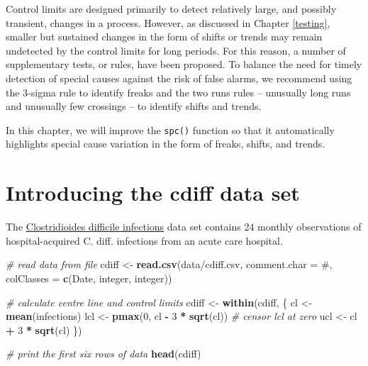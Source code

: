 \documentclass[
]{book}
\newenvironment{Shaded}{\begin{snugshade}}{\end{snugshade}}
\newcommand{\AttributeTok}[1]{\textcolor[rgb]{0.13,0.29,0.53}{#1}}
\newcommand{\CommentTok}[1]{\textcolor[rgb]{0.56,0.35,0.01}{\textit{#1}}}
\newcommand{\DecValTok}[1]{\textcolor[rgb]{0.00,0.00,0.81}{#1}}
\newcommand{\FunctionTok}[1]{\textcolor[rgb]{0.13,0.29,0.53}{\textbf{#1}}}
\newcommand{\NormalTok}[1]{#1}
\newcommand{\OtherTok}[1]{\textcolor[rgb]{0.56,0.35,0.01}{#1}}
\newcommand{\SpecialCharTok}[1]{\textcolor[rgb]{0.81,0.36,0.00}{\textbf{#1}}}
\newcommand{\StringTok}[1]{\textcolor[rgb]{0.31,0.60,0.02}{#1}}
\begin{document}
Control limits are designed primarily to detect relatively large, and possibly transient, changes in a process. However, as discussed in Chapter \ref{testing}, smaller but sustained changes in the form of shifts or trends may remain undetected by the control limits for long periods. For this reason, a number of supplementary tests, or rules, have been proposed. To balance the need for timely detection of special causes against the risk of false alarms, we recommend using the 3-sigma rule to identify freaks and the two runs rules -- unusually long runs and unusually few crossings -- to identify shifts and trends.

In this chapter, we will improve the \texttt{spc()} function so that it automatically highlights special cause variation in the form of freaks, shifts, and trends.

\section{Introducing the cdiff data set}\label{introducing-the-cdiff-data-set}

The \hyperref[clostridioides-difficile-infections]{Clostridioides difficile infections} data set contains 24 monthly observations of hospital-acquired C. diff. infections from an acute care hospital.

\begin{Shaded}
\begin{Highlighting}[]
\CommentTok{\# read data from file}
\NormalTok{cdiff }\OtherTok{\textless{}{-}} \FunctionTok{read.csv}\NormalTok{(}\StringTok{\textquotesingle{}data/cdiff.csv\textquotesingle{}}\NormalTok{,}
                  \AttributeTok{comment.char =} \StringTok{\textquotesingle{}\#\textquotesingle{}}\NormalTok{,}
                  \AttributeTok{colClasses =} \FunctionTok{c}\NormalTok{(}\StringTok{\textquotesingle{}Date\textquotesingle{}}\NormalTok{,}
                                 \StringTok{\textquotesingle{}integer\textquotesingle{}}\NormalTok{,}
                                 \StringTok{\textquotesingle{}integer\textquotesingle{}}\NormalTok{))}

\CommentTok{\# calculate centre line and control limits}
\NormalTok{cdiff }\OtherTok{\textless{}{-}} \FunctionTok{within}\NormalTok{(cdiff, \{}
\NormalTok{  cl  }\OtherTok{\textless{}{-}} \FunctionTok{mean}\NormalTok{(infections)}
\NormalTok{  lcl }\OtherTok{\textless{}{-}} \FunctionTok{pmax}\NormalTok{(}\DecValTok{0}\NormalTok{, cl }\SpecialCharTok{{-}} \DecValTok{3} \SpecialCharTok{*} \FunctionTok{sqrt}\NormalTok{(cl)) }\CommentTok{\# censor lcl at zero}
\NormalTok{  ucl }\OtherTok{\textless{}{-}}\NormalTok{ cl }\SpecialCharTok{+} \DecValTok{3} \SpecialCharTok{*} \FunctionTok{sqrt}\NormalTok{(cl)}
\NormalTok{\})}

\CommentTok{\# print the first six rows of data}
\FunctionTok{head}\NormalTok{(cdiff)}
\end{Highlighting}
\end{Shaded}
\end{document}
